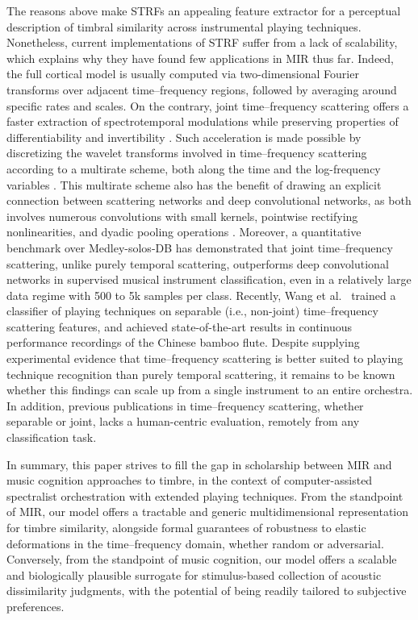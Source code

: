 \documentclass{bmcart}
\makeatletter
\newcommand*{\ie}{i.e.,\@\xspace}
\makeatother
\begin{document}
The reasons above make STRFs an appealing feature extractor for a perceptual description of timbral similarity across instrumental playing techniques.
Nonetheless, current implementations of STRF suffer from a lack of scalability, which explains why they have found few applications in MIR thus far.
Indeed, the full cortical model is usually computed via two-dimensional Fourier transforms over adjacent time--frequency regions, followed by averaging around specific rates and scales.
On the contrary, joint time--frequency scattering offers a faster extraction of spectrotemporal modulations while preserving properties of differentiability \cite{andreux2019jmlr} and invertibility \cite{lostanlen2019dafx}.
Such acceleration is made possible by discretizing the wavelet transforms involved in time--frequency scattering according to a multirate scheme, both along the time and the log-frequency variables \cite{anden2019tsp}.
This multirate scheme also has the benefit of drawing an explicit connection between scattering networks and deep convolutional networks, as both involves numerous convolutions with small kernels, pointwise rectifying nonlinearities, and dyadic pooling operations \cite{mallat2016philtrans}.
Moreover, a quantitative benchmark over Medley-solos-DB has demonstrated that joint time--frequency scattering, unlike purely temporal scattering, outperforms deep convolutional networks in supervised musical instrument classification, even in a relatively large data regime with 500 to 5k samples per class.
Recently, Wang et al.~\cite{wang2019ismir} trained a classifier of playing techniques on separable (\ie{} non-joint) time--frequency scattering features, and achieved state-of-the-art results in continuous performance recordings of the Chinese bamboo flute.
Despite supplying experimental evidence that time--frequency scattering is better suited to playing technique recognition than purely temporal scattering, it remains to be known whether this findings can scale up from a single instrument to an entire orchestra.
In addition, previous publications in time--frequency scattering, whether separable or joint, lacks a human-centric evaluation, remotely from any classification task.

In summary, this paper strives to fill the gap in scholarship between MIR and music cognition approaches to timbre, in the context of computer-assisted spectralist orchestration with extended playing techniques.
From the standpoint of MIR, our model offers a tractable and generic multidimensional representation for timbre similarity, alongside formal guarantees of robustness to elastic deformations in the time--frequency domain, whether random or adversarial.
Conversely, from the standpoint of music cognition, our model offers a scalable and biologically plausible surrogate for stimulus-based collection of acoustic dissimilarity judgments, with the potential of being readily tailored to subjective preferences.
\end{document}
